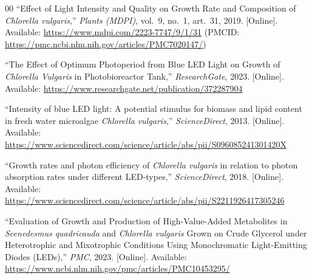\documentclass[conference]{IEEEtran}
\begin{document}
\begin{thebibliography}{00}
``Effect of Light Intensity and Quality on Growth Rate and Composition of
\textit{Chlorella vulgaris},'' \textit{Plants (MDPI)}, vol.~9, no.~1,
art.~31, 2019. [Online]. Available: \url{https://www.mdpi.com/2223-7747/9/1/31} (PMCID: \url{https://pmc.ncbi.nlm.nih.gov/articles/PMC7020147/})

``The Effect of Optimum Photoperiod from Blue LED Light on Growth of
\textit{Chlorella Vulgaris} in Photobioreactor Tank,'' \textit{ResearchGate},
2023. [Online]. Available:
\url{https://www.researchgate.net/publication/372287904}

``Intensity of blue LED light: A potential stimulus for biomass and lipid
content in fresh water microalgae \textit{Chlorella vulgaris},''
\textit{ScienceDirect}, 2013. [Online]. Available:
\url{https://www.sciencedirect.com/science/article/abs/pii/S096085241301420X}

``Growth rates and photon efficiency of \textit{Chlorella vulgaris} in
relation to photon absorption rates under different LED-types,''
\textit{ScienceDirect}, 2018. [Online]. Available:
\url{https://www.sciencedirect.com/science/article/abs/pii/S2211926417305246}

``Evaluation of Growth and Production of High-Value-Added Metabolites in
\textit{Scenedesmus quadricauda} and \textit{Chlorella vulgaris} Grown on
Crude Glycerol under Heterotrophic and Mixotrophic Conditions Using
Monochromatic Light-Emitting Diodes (LEDs),'' \textit{PMC}, 2023. [Online].
Available: \url{https://www.ncbi.nlm.nih.gov/pmc/articles/PMC10453295/}

\end{thebibliography}
\end{document}
